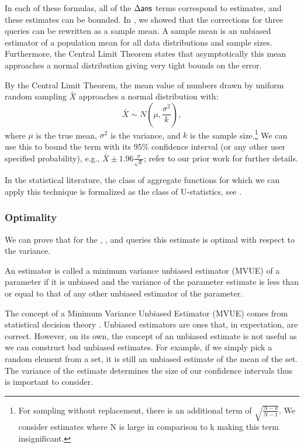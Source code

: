 In each of these formulas, all of the $\Delta\textsf{ans}$ terms correspond to estimates, and these estimates can be bounded.
In \cite{wang1999sample}, we showed that the corrections for three queries can be rewritten as a sample mean.
A sample mean is an unbiased estimator of a population mean for all data distributions and sample sizes.
Furthermore, the Central Limit Theorem states that asymptotically this mean approaches a normal distribution giving very tight bounds on the error.

By the Central Limit Theorem, the mean value of numbers drawn by uniform random sampling $\bar{X}$ approaches a normal distribution with:
\[
\bar{X} \sim N(\mu,\frac{\sigma^2}{k}),
\]
where $\mu$ is the true mean, $\sigma^2$ is the variance, and $k$ is the sample size.\footnote{\scriptsize For sampling without replacement, there is an additional term of $\sqrt{\frac{N-k}{N-1}}$. We consider estimates where N is large in comparison to k making this term insignificant.}
We can use this to bound the term with its 95\% confidence interval (or any other user specified probability), e.g., $\bar{X} \pm 1.96 \frac{\sigma}{\sqrt{k}}$; refer to our prior work \cite{wang1999sample} for further details.

In the statistical literature, the class of aggregate functions for which we can apply this technique is formalized as the class of U-statistics, see \cite{hoeffding1948class}.

\subsubsection{Optimality}
We can prove that for the \sumfunc, \countfunc, and \avgfunc queries this estimate is optimal with respect to the variance.
\begin{proposition}
An estimator is called a minimum variance unbiased estimator (MVUE) of a parameter if it is unbiased and the variance of the parameter estimate is less than or equal to that of any other unbiased estimator of the parameter.
\end{proposition}
The concept of a Minimum Variance Unbiased Estimator (MVUE) comes from statistical decision theory \cite{cox1979theoretical}.
Unbiased estimators are ones that, in expectation, are correct.
However, on its own, the concept of an unbiased estimate is not useful as we can construct bad unbiased estimates.
For example, if we simply pick a random element from a set, it is still an unbiased estimate of the mean of the set.
The variance of the estimate determines the size of our confidence intervals thus is important to consider.

